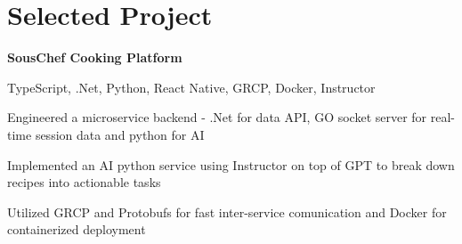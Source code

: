 
\newenvironment{twocolentry_proj}[2][]{
    \onecolentry
    \def\secondColumn{#2}
    \setcolumnwidth{\fill, 7 cm}
    \begin{paracol}{2}
}{
    \switchcolumn \raggedleft \secondColumn
    \end{paracol}
    \endonecolentry
} %

\vspace{5 pt - 0.4 cm}
\section{Selected Project}
\begin{twocolentry_proj}{
    \mbox{}%
}

\textbf{SousChef Cooking Platform}
\end{twocolentry_proj}

\vspace{0.10 cm}
\begin{onecolentry}
    \small TypeScript, .Net, Python, React Native, GRCP, Docker, Instructor 
    \begin{highlights}
        \item Engineered a microservice backend - .Net for data API, GO socket server for real-time session data and python for AI
        \item Implemented an AI python service using Instructor on top of GPT to break down recipes into actionable tasks
        \item Utilized GRCP and Protobufs for fast inter-service comunication and Docker for containerized deployment
    \end{highlights}
\end{onecolentry}
